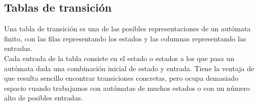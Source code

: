 \subsection{Tablas de transición}
Una tabla de transición es una de las posibles representaciones de un autómata finito, con las filas representando los estados y las columnas representando las entradas.
\\
Cada entrada de la tabla consiste en el estado o estados a los que pasa un autómata dada una combinación inicial de estado y entrada.
Tiene la ventaja de que resulta sencillo encontrar transiciones concretas, pero ocupa demasiado espacio cuando trabajamos con autómatas de muchos estados o con un número alto de posibles entradas.
